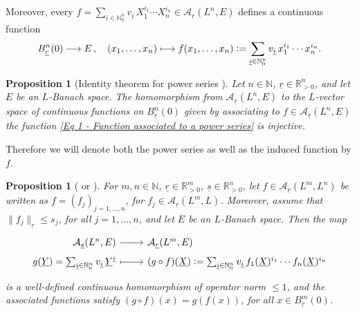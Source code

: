 \documentclass[a4paper, reqno, 10pt]{amsart}
\newtheorem{proposition}[theorem]{Proposition}
\theoremstyle{definition}
\numberwithin{equation}{section}
\newcommand{\defeq}{\vcentcolon=}
\newcommand{\lra}{\longrightarrow}
\newcommand{\lto}{\longmapsto}
\newcommand{\norm}[1]{\lVert{#1}\rVert}
\newcommand{\ul}[1]{{\underline{#1}}}
\newcommand{\BN}{{\mathbb {N}}}
\newcommand{\BR}{{\mathbb {R}}}
\newcommand{\CA}{{\mathcal {A}}}
\begin{document}
Moreover, every $f = \sum_{\ul{i}\in \BN^n_0} v_{\ul{i}} \,X_1^{i_1}\cdots X_n^{i_n}\in \CA_\ul{r}(L^n,E)$ defines a continuous function
\begin{equation}\label{Eq 1 - Function associated to a power series}
	B_\ul{r}^n(0) \lra E \,,\quad (x_1,\ldots,x_n) \lto f(x_1,\ldots,x_n) \defeq  \sum_{\ul{i}\in \BN^n_0} v_{\ul{i}} \, x_1^{i_1}\cdots x_n^{i_n} .
\end{equation}

\begin{proposition}[{Identity theorem for power series \cite[4.1.4]{Bourbaki07VarDiffAnFasciDeResult}}]\label{Prop 1 - Identity theorem for power series}
	Let $n\in \BN$, $\ul{r} \in \BR_{>0}^n$, and let $E$ be an $L$-Banach space.
	The homomorphism from $\CA_\ul{r}(L^n,E)$ to the $L$-vector space of continuous functions on $B_\ul{r}^{n}(0)$ given by associating to $f \in \CA_\ul{r}(L^n, E)$ the function \eqref{Eq 1 - Function associated to a power series} is injective.
\end{proposition}

Therefore we will denote both the power series as well as the induced function by $f$.




\begin{proposition}[{\cite[4.1.5]{Bourbaki07VarDiffAnFasciDeResult} or \cite[Prop.\ 5.4]{Schneider11pAdicLieGrps}}]\label{Prop 1 - Composition of power series}
	For $m,n \in \BN$, $\ul{r} \in \BR_{>0}^m$, $\ul{s}\in \BR_{>0}^n$, let $f\in \CA_\ul{r}(L^m,L^n)$ be written as $f = (f_j)_{j=1,\ldots,n}$, for $f_j \in \CA_{\ul{r}}(L^m, L)$.
	Moreover, assume that $\norm{f_j}_\ul{r} \leq s_j$, for all $j=1,\ldots,n$, and let $E$ be an $L$-Banach space.
	Then the map
	\begin{equation*}
		\begin{tikzcd}[row sep = 0ex,	/tikz/column 1/.append style={anchor=base east},	/tikz/column 2/.append style={anchor=base west}]
			\CA_\ul{s}(L^n, E) \ar[r] &\CA_\ul{r}(L^m,E) \\
			g(\ul{Y}) = \sum_{\ul{i} \in \BN^n_0} v_{\ul{i}} \,\ul{Y}^{\ul{i}} \ar[r, mapsto] &(g\circ f)(\ul{X}) \defeq  \sum_{\ul{i}\in \BN^n_0} v_{\ul{i}}\, f_1(\ul{X})^{i_1} \cdots f_n(\ul{X})^{i_n}
		\end{tikzcd}
	\end{equation*}
	is a well-defined continuous homomorphism of operator norm $\leq 1$, and the associated functions satisfy $(g\circ f)(x) =g(f(x))$, for all $x\in B_\ul{r}^{m}(0)$. 
\end{proposition}
\end{document}
